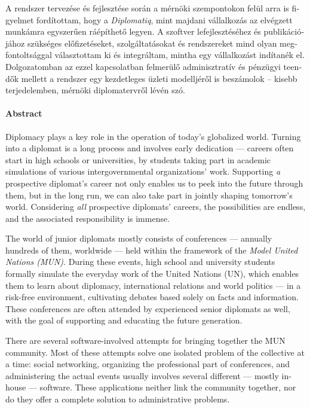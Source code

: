 \begin{otherlanguage}{magyar}
A rendszer tervezése és fejlesztése során a mérnöki szempontokon felül arra is figyelmet fordítottam, hogy a \emph{Diplomatiq}, mint majdani vállalkozás az elvégzett munkámra egyszerűen ráépíthető legyen. A szoftver lefejlesztéséhez és publikációjához szükséges előfizetéseket, szolgáltatásokat és rendszereket mind olyan megfontoltsággal választottam ki és integráltam, mintha egy vállalkozást indítanék el. Dolgozatomban az ezzel kapcsolatban felmerülő adminisztratív és pénzügyi teendők mellett a rendszer egy kezdetleges üzleti modelljéről is beszámolok – kisebb terjedelemben, mérnöki diplomatervről lévén szó.

\end{otherlanguage}

\clearpage

\paragraph*{Abstract}
{}
\thispagestyle{plain}

Diplomacy plays a key role in the operation of today's globalized world. Turning into a diplomat is a long process and involves early dedication — careers often start in high schools or universities, by students taking part in academic simulations of various intergovernmental organizations' work. Supporting \emph{a} prospective diplomat's career not only enables us to peek into the future through them, but in the long run, we can also take part in jointly shaping tomorrow's world. Considering \emph{all} prospective diplomats' careers, the possibilities are endless, and the associated responsibility is immense.

The world of junior diplomats mostly consists of conferences — annually hundreds of them, worldwide — held within the framework of the \emph{Model United Nations (MUN)}. During these events, high school and university students formally simulate the everyday work of the United Nations (UN), which enables them to learn about diplomacy, international relations and world politics — in a risk-free environment, cultivating debates based solely on facts and information. These conferences are often attended by experienced senior diplomats as well, with the goal of supporting and educating the future generation.

There are several software-involved attempts for bringing together the MUN community. Most of these attempts solve one isolated problem of the collective at a time: social networking, organizing the professional part of conferences, and administering the actual events usually involves several different — mostly in-house — software. These applications neither link the community together, nor do they offer a complete solution to administrative problems.

